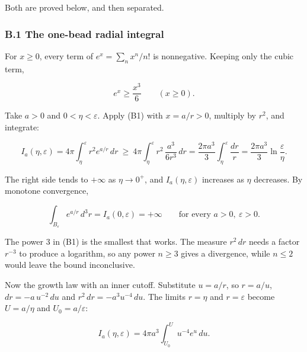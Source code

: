 \documentclass[11pt,a4paper]{article}
\newcommand{\tagmark}[1]{\marginnote{\scriptsize\ttfamily #1}}
\begin{document}
Both are proved below, and then separated.

\hypertarget{b.1-the-one-bead-radial-integral}{%
\subsubsection{B.1 The one-bead radial integral}\label{b.1-the-one-bead-radial-integral}}

\tagmark{[D]} For \(x\ge0\), every term of \(e^x=\sum_n x^n/n!\) is nonnegative. Keeping only the cubic term,

\begin{equation}
e^x\ge\frac{x^3}{6}\qquad(x\ge0).\tag{B1}
\end{equation}

\tagmark{[D]} Take \(a>0\) and \(0<\eta<\varepsilon\). Apply (B1) with \(x=a/r>0\), multiply by \(r^2\), and integrate:

\begin{equation}
I_a(\eta,\varepsilon)=4\pi\int_\eta^\varepsilon r^2e^{a/r}\,dr\ \ge\ 4\pi\int_\eta^\varepsilon r^2\,\frac{a^3}{6r^3}\,dr=\frac{2\pi a^3}{3}\int_\eta^\varepsilon\frac{dr}{r}=\frac{2\pi a^3}{3}\ln\frac{\varepsilon}{\eta}.\tag{B2}
\end{equation}

The right side tends to \(+\infty\) as \(\eta\to0^+\), and \(I_a(\eta,\varepsilon)\) increases as \(\eta\) decreases. By monotone convergence,

\begin{equation}
\int_{B_\varepsilon}e^{a/r}\,d^3r=I_a(0,\varepsilon)=+\infty\qquad\text{for every }a>0,\ \varepsilon>0.\tag{B3}
\end{equation}

The power 3 in (B1) is the smallest that works. The measure \(r^2\,dr\) needs a factor \(r^{-3}\) to produce a logarithm, so any power \(n\ge3\) gives a divergence, while \(n\le2\) would leave the bound inconclusive.

\tagmark{[D]} Now the growth law with an inner cutoff. Substitute \(u=a/r\), so \(r=a/u\), \(dr=-a\,u^{-2}\,du\) and \(r^2\,dr=-a^3u^{-4}\,du\). The limits \(r=\eta\) and \(r=\varepsilon\) become \(U=a/\eta\) and \(U_0=a/\varepsilon\):

\begin{equation}
I_a(\eta,\varepsilon)=4\pi a^3\int_{U_0}^{U}u^{-4}e^{u}\,du.\tag{B4}
\end{equation}
\end{document}

